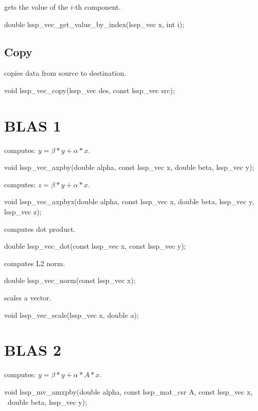  gets the value of the $i$-th component.
\begin{evb}
double lssp_vec_get_value_by_index(lssp_vec x, int i);
\end{evb}

\subsection{Copy}
 copies data from source to destination.
\begin{evb}
void lssp_vec_copy(lssp_vec des, const lssp_vec src);
\end{evb}

\section{BLAS 1}
 computes: $y = \beta * y + \alpha * x$.
\begin{evb}
void lssp_vec_axpby(double alpha, const lssp_vec x, double beta, lssp_vec y);
\end{evb}

 computes: $z = \beta * y + \alpha * x$.
\begin{evb}
void lssp_vec_axpbyz(double alpha, const lssp_vec x, double beta,
    lssp_vec y, lssp_vec z);
\end{evb}

 computes dot product.
\begin{evb}
double lssp_vec_dot(const lssp_vec x, const lssp_vec y);
\end{evb}

 computes L2 norm.
\begin{evb}
double lssp_vec_norm(const lssp_vec x);
\end{evb}

 scales a vector.
\begin{evb}
void lssp_vec_scale(lssp_vec x, double a);
\end{evb}

\section{BLAS 2}

 computes: $y = \beta * y + \alpha * A * x$.
\begin{evb}
void lssp_mv_amxpby(double alpha, const lssp_mat_csr A, const lssp_vec x, \
    double beta, lssp_vec y);
\end{evb}

